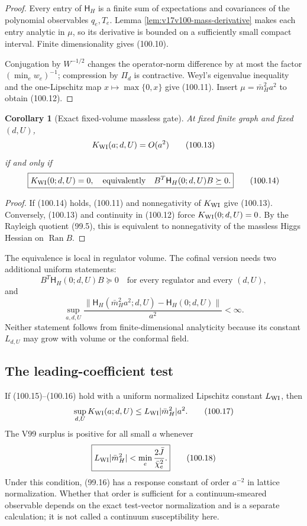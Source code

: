 \documentclass[11pt]{article}
\newtheorem{corollary}[theorem]{Corollary}
\theoremstyle{remark}
\begin{document}
\begin{proof}
Every entry of \(\mathsf H_H\) is a finite sum of expectations and
covariances of the polynomial observables \(q_e,T_e\).  Lemma
\ref{lem:v17v100-mass-derivative} makes each entry analytic in \(\mu\),
so its derivative is bounded on a sufficiently small compact interval.
Finite dimensionality gives (100.10).

Conjugation by \(W^{-1/2}\) changes the operator-norm difference by at
most the factor \((\min_ew_e)^{-1}\); compression by \(\Pi_d\) is
contractive.  Weyl's eigenvalue inequality and the one-Lipschitz map
\(x\mapsto\max\{0,x\}\) give (100.11).  Insert
\(\mu=\bar m_H^2a^2\) to obtain (100.12).
\end{proof}

\begin{corollary}[Exact fixed-volume massless gate]
\label{cor:v17v100-massless-gate}
At fixed finite graph and fixed \((d,U)\),
\[
 K_{\rm WI}(a;d,U)=O(a^2)                           \tag{100.13}
\]
if and only if
\[
\boxed{
 K_{\rm WI}(0;d,U)=0,
 \quad\text{equivalently}\quad
 B^T\mathsf H_H(0;d,U)B\succeq0.}                  \tag{100.14}
\]
\end{corollary}

\begin{proof}
If (100.14) holds, (100.11) and nonnegativity of
\(K_{\rm WI}\) give (100.13).  Conversely, (100.13) and continuity in
(100.12) force \(K_{\rm WI}(0;d,U)=0\).  By the Rayleigh quotient
(99.5), this is equivalent to nonnegativity of the massless Higgs
Hessian on \(\operatorname{Ran}B\).
\end{proof}

The equivalence is local in regulator volume.  The cofinal version
needs two additional uniform statements:
\[
 B^T\mathsf H_H(0;d,U)B\succeq0
 \quad\text{for every regulator and every }(d,U),   \tag{100.15}
\]
and
\[
 \sup_{a,d,U}
 \frac{\|\mathsf H_H(\bar m_H^2a^2;d,U)
             -\mathsf H_H(0;d,U)\|}{a^2}<\infty.   \tag{100.16}
\]
Neither statement follows from finite-dimensional analyticity because
its constant \(L_{d,U}\) may grow with volume or the conformal field.

\subsection{The leading-coefficient test}

If (100.15)--(100.16) hold with a uniform normalized Lipschitz constant
\(L_{\rm WI}\), then
\[
 \sup_{d,U}K_{\rm WI}(a;d,U)
 \leq L_{\rm WI}|\bar m_H^2|a^2.                   \tag{100.17}
\]
The V99 surplus is positive for all small \(a\) whenever
\[
\boxed{
 L_{\rm WI}|\bar m_H^2|
 <\min_e\frac{2\bar J}{\bar\chi_e^2}.}              \tag{100.18}
\]
Under this condition, (99.16) has a response constant of order
\(a^{-2}\) in lattice normalization.  Whether that order is sufficient
for a continuum-smeared observable depends on the exact test-vector
normalization and is a separate calculation; it is not called a
continuum susceptibility here.
\end{document}
